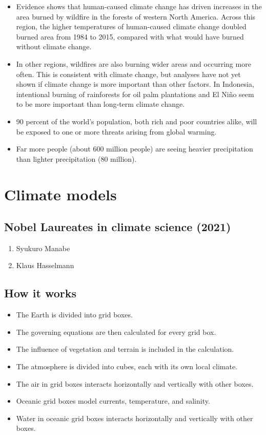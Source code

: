 \documentclass[11pt]{article}
\begin{document}
\newpage

\begin{itemize}
\item Evidence shows that human-caused climate change has driven increases in the area burned by wildfire in the forests of western North America. Across this region, the higher temperatures of human-caused climate change doubled burned area from 1984 to 2015, compared with what would have burned without climate change.
\item In other regions, wildfires are also burning wider areas and occurring more often. This is consistent with climate change, but analyses have not yet shown if climate change is more important than other factors. In Indonesia, intentional burning of rainforests for oil palm plantations and El Niño seem to be more important than long-term climate change.
\item 90 percent of the world's population, both rich and poor countries alike, will be exposed to one or more threats arising from global warming.
\item Far more people (about 600 million people) are seeing heavier precipitation than lighter precipitation (80 million).
\end{itemize}

\newpage

\section{Climate models}
\label{sec:org5d4cd46}

\subsection{Nobel Laureates in climate science (2021)}
\label{sec:orgb01bbdb}
\begin{enumerate}
\item Syukuro Manabe
\item Klaus Hasselmann
\end{enumerate}

\subsection{How it works}
\label{sec:org3e5fe69}
\begin{itemize}
\item The Earth is divided into grid boxes.
\item The governing equations are then calculated for every grid box.
\item The influence of vegetation and terrain is included in the calculation.
\item The atmosphere is divided into cubes, each with its own local climate.
\item The air in grid boxes interacts horizontally and vertically with other boxes.
\item Oceanic grid boxes model currents, temperature, and salinity.
\item Water in oceanic grid boxes interacts horizontally and vertically with other boxes.
\end{itemize}
\end{document}
